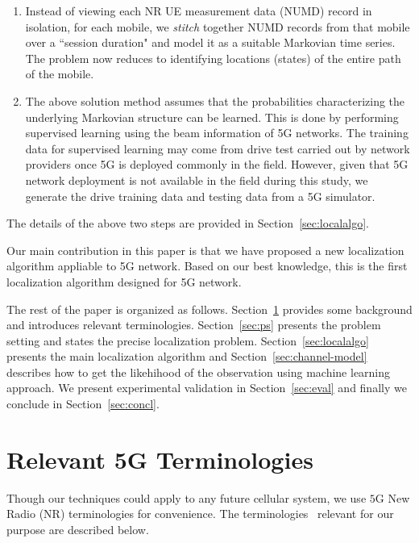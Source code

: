 \documentclass[conference, 10pt]{IEEEtran}
\begin{document}
\begin{enumerate}
    \item Instead of viewing each NR UE measurement data (NUMD) record in isolation, for each mobile, we {\em stitch}
together NUMD records from that mobile over a ``session
duration"  and model it as a suitable Markovian time series. The problem now
reduces to identifying locations (states) of the entire path of
the mobile.

\item The above solution method assumes that the probabilities characterizing the
underlying Markovian structure can be learned. This is done by performing supervised learning using the beam information of 5G networks.
The training data for supervised learning may come from
drive test carried out by network providers once 5G is deployed commonly in the field. However, given that 5G network deployment is not available in the field during this study, we generate the drive training data and testing data from a 5G simulator.
	
\end{enumerate}

The details of the above two steps are provided in Section~\ref{sec:localalgo}.


Our main contribution in this paper is that we have proposed a new localization algorithm
appliable to 5G network. Based on our best knowledge, this is the first localization algorithm designed for 5G network. 


The rest of the paper is organized as follows. Section~\ref{sec:bg} provides some
background and introduces relevant terminologies. Section~\ref{sec:ps} presents
the problem setting and states the precise localization problem.
Section~\ref{sec:localalgo}
presents the main localization algorithm and Section~\ref{sec:channel-model} describes how to get the likehihood of the observation using machine learning approach. 
We present experimental validation in Section~\ref{sec:eval} and finally we conclude in
Section~\ref{sec:concl}.




\section{Relevant 5G Terminologies}
\label{sec:bg}
Though our techniques could apply to any future cellular system, we use $5$G New Radio (NR) 
terminologies for convenience. The terminologies~\cite{3gpp38series} relevant for our purpose are described below.
\end{document}
